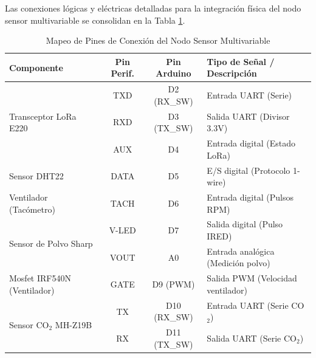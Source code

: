 Las conexiones lógicas y eléctricas detalladas para la integración física del nodo sensor multivariable se consolidan en la Tabla \ref{tabla:mapeo_pines_nodo}.

\begin{table}[H]
    \centering
    \renewcommand{\arraystretch}{1.3}
    \caption{Mapeo de Pines de Conexión del Nodo Sensor Multivariable}
    \label{tabla:mapeo_pines_nodo}
    \begin{tabular}{|p{3.5cm}|c|c|p{5cm}|}
        \hline
        \textbf{Componente}                    & \textbf{Pin Perif.} & \textbf{Pin Arduino} & \textbf{Tipo de Señal / Descripción} \\ \hline
        \multirow{3}{*}{Transceptor LoRa E220} & TXD                 & D2 (RX\_SW)          & Entrada UART (Serie)                 \\ \cline{2-4}
                                               & RXD                 & D3 (TX\_SW)          & Salida UART (Divisor 3.3V)           \\ \cline{2-4}
                                               & AUX                 & D4                   & Entrada digital (Estado LoRa)        \\ \hline
        Sensor DHT22                           & DATA                & D5                   & E/S digital (Protocolo 1-wire)       \\ \hline
        Ventilador (Tacómetro)                 & TACH                & D6                   & Entrada digital (Pulsos RPM)         \\ \hline
        \multirow{2}{*}{Sensor de Polvo Sharp} & V-LED               & D7                   & Salida digital (Pulso IRED)          \\ \cline{2-4}
                                               & VOUT                & A0                   & Entrada analógica (Medición polvo)   \\ \hline
        Mosfet IRF540N (Ventilador)            & GATE                & D9 (PWM)             & Salida PWM (Velocidad ventilador)    \\ \hline
        \multirow{2}{*}{Sensor CO$_2$ MH-Z19B} & TX                  & D10 (RX\_SW)         & Entrada UART (Serie CO$_2$)          \\ \cline{2-4}
                                               & RX                  & D11 (TX\_SW)         & Salida UART (Serie CO$_2$)           \\ \hline
    \end{tabular}
\end{table}

